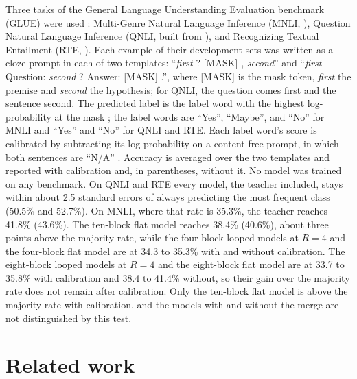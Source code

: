 \documentclass[11pt]{article}
\begin{document}
Three tasks of the General Language Understanding Evaluation benchmark (GLUE) were used \citep{wang2019glue}: Multi-Genre Natural Language
Inference (MNLI, \citealp{williams2018mnli}), Question Natural Language Inference (QNLI, built from \citealp{rajpurkar2016squad}), and Recognizing
Textual Entailment (RTE, \citealp{dagan2006rte}). Each example of their development sets was written as a cloze prompt in each of two
templates: ``\emph{first} ? [MASK] , \emph{second}'' and ``\emph{first} Question: \emph{second} ? Answer: [MASK] .'', where [MASK] is the
mask token, \emph{first} the premise and \emph{second} the hypothesis; for QNLI, the question comes first and the sentence second. The predicted label is the label word
with the highest log-probability at the mask \citep{schick2021pet,gao2021lmbff}; the label words are ``Yes'', ``Maybe'', and ``No'' for MNLI and
``Yes'' and ``No'' for QNLI and RTE. Each label word's score is calibrated by subtracting its log-probability on a content-free prompt, in which
both sentences are ``N/A'' \citep{zhao2021calibrate}. Accuracy is averaged over the two templates and reported with calibration and, in
parentheses, without it. No model was trained on any benchmark. On QNLI and RTE every model, the teacher included, stays
within about 2.5 standard errors of always predicting the most frequent class (50.5\% and 52.7\%). On MNLI, where that rate is 35.3\%, the
teacher reaches 41.8\% (43.6\%). The ten-block flat model reaches 38.4\% (40.6\%), about three points above the majority rate, while the
four-block looped models at $R = 4$ and the four-block flat model are at 34.3 to 35.3\% with and without calibration. The eight-block looped
models at $R = 4$ and the eight-block flat model are at 33.7 to 35.8\% with calibration and 38.4 to 41.4\% without, so their gain over the
majority rate does not remain after calibration. Only the ten-block flat model is above the majority rate with calibration, and the models
with and without the merge are not distinguished by this test.

\section{Related work}
\label{sec:related}
\end{document}
